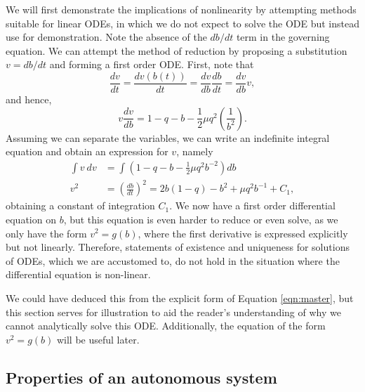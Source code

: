 \documentclass{report}
\begin{document}
We will first demonstrate the implications of nonlinearity by attempting methods suitable for linear ODEs,
in which we do not expect to solve the ODE but instead use for demonstration.
Note the absence of the $db/dt$ term in the governing equation.
We can attempt the method of reduction by proposing a substitution $v=db/dt$ and forming a first order ODE.
First, note that
\begin{equation}
    \frac{dv}{dt} = \frac{dv(b(t))}{dt} = \frac{dv}{db}\frac{db}{dt} = \frac{dv}{db}v,
\end{equation}
and hence,
\begin{equation}
    v \frac{dv}{db} = 1 - q - b - \frac{1}{2}\mu q^2\left( \frac{1}{b^2} \right).
\end{equation}
Assuming we can separate the variables, we can write an indefinite integral equation and obtain an expression for $v$, namely
\begin{equation}
    \begin{aligned}
        \int v~dv &= \int \left(1 - q - b - \frac{1}{2}\mu q^2 b^{-2} \right) db \\  %
        v^2 &= \left(\frac{db}{dt}\right)^2 = 2b(1-q) - {b^2} + \mu q^2 b^{-1} + C_1, %
    \end{aligned}
    \label{eqn:first_order_reduction}
\end{equation}
obtaining a constant of integration $C_1$.
We now have a first order differential equation on $b$, %
but this equation is even harder to reduce or even solve, as we only have the form $v^2 = g(b)$,
where the first derivative is expressed explicitly but not linearly.
Therefore, statements of existence and uniqueness for solutions of ODEs,
which we are accustomed to,
do not hold in the situation where the differential equation is non-linear.

We could have deduced this from the explicit form of Equation \ref{eqn:master},
but this section serves for illustration to aid the reader's understanding of why we cannot analytically solve this ODE.
Additionally, the equation of the form $v^2 = g(b)$ will be useful later.

\subsection{Properties of an autonomous system}
\end{document}
